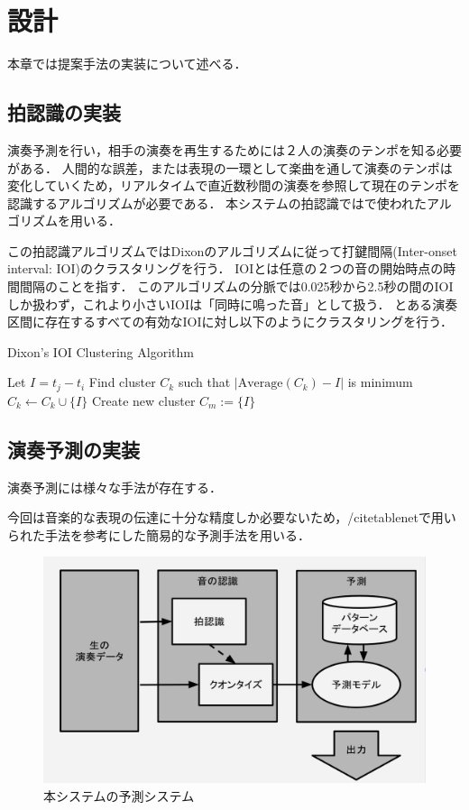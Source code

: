 \chapter{設計}
\label{implementation}

本章では提案手法の実装について述べる．

\section{拍認識の実装}
演奏予測を行い，相手の演奏を再生するためには２人の演奏のテンポを知る必要がある．
人間的な誤差，または表現の一環として楽曲を通して演奏のテンポは変化していくため，リアルタイムで直近数秒間の演奏を参照して現在のテンポを認識するアルゴリズムが必要である．
本システムの拍認識では\cite{dixon:2000}で使われたアルゴリズムを用いる．

この拍認識アルゴリズムではDixonのアルゴリズム\cite{dixon}に従って打鍵間隔(Inter-onset interval: IOI)のクラスタリングを行う．
IOIとは任意の２つの音の開始時点の時間間隔のことを指す．
このアルゴリズムの分脈では0.025秒から2.5秒の間のIOIしか扱わず，これより小さいIOIは「同時に鳴った音」として扱う．
とある演奏区間に存在するすべての有効なIOIに対し以下のようにクラスタリングを行う．

\begin{algorithm}
  \caption{Dixon's IOI Clustering Algorithm}
\begin{algorithmic}[1]
        \State Let \( I = t_j - t_i \)
        \State Find cluster \( C_k \) such that \( | \text{Average}(C_k) - I | \) is minimum
            \State \( C_k \gets C_k \cup \{ I \} \)
        \Else
            \State Create new cluster \( C_m := \{ I \} \)
        \EndIf
    \EndIf
\EndFor
\end{algorithmic}
\end{algorithm}

\section{演奏予測の実装}
演奏予測には様々な手法が存在する．

今回は音楽的な表現の伝達に十分な精度しか必要ないため，/cite{tablenet}で用いられた手法を参考にした簡易的な予測手法を用いる．

\begin{figure}[htbp]
  \centering
  \includegraphics[width=0.8\linewidth]{src/pred.png}
  \caption{本システムの予測システム}
  \label{fig:tablenet}
\end{figure}

